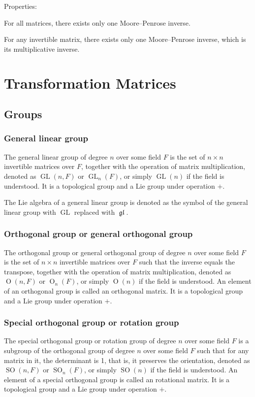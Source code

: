 \documentclass[a4paper,12pt]{report}
\begin{document}
Properties:
\bit
\item For all matrices, there exists only one Moore–Penrose inverse.
\item For any invertible matrix, there exists only one Moore–Penrose inverse, which is its multiplicative inverse.
\eit
\section{Transformation Matrices}
\subsection{Groups}
\subsubsection{General linear group}
The general linear group of degree $n$ over some field $F$ is the set of $n\times n$ invertible matrices over $F$, together with the operation of matrix multiplication, denoted as $\operatorname{GL}(n,F)$ or $\operatorname{GL}_n(F)$, or simply $\operatorname{GL}(n)$ if the field is understood. It is a topological group and a Lie group under operation $+$.

The Lie algebra of a general linear group is denoted as the symbol of the general linear group with $\operatorname{GL}$ replaced with $\operatorname{\mathfrak{gl}}$.
\subsubsection{Orthogonal group or general orthogonal group}
The orthogonal group or general orthogonal group of degree $n$ over some field $F$ is the set of $n\times n$ invertible matrices over $F$ such that the inverse equals the transpose, together with the operation of matrix multiplication, denoted as $\operatorname{O}(n,F)$ or $\operatorname{O}_n(F)$, or simply $\operatorname{O}(n)$ if the field is understood. An element of an orthogonal group is called an orthogonal matrix. It is a topological group and a Lie group under operation $+$.
\subsubsection{Special orthogonal group or rotation group}
The special orthogonal group or rotation group of degree $n$ over some field $F$ is a subgroup of the orthogonal group of degree $n$ over some field $F$ such that for any matrix in it, the determinant is 1, that is, it preserves the orientation, denoted as $\operatorname{SO}(n,F)$ or $\operatorname{SO}_n(F)$, or simply $\operatorname{SO}(n)$ if the field is understood. An element of a special orthogonal group is called an rotational matrix. It is a topological group and a Lie group under operation $+$.
\end{document}
